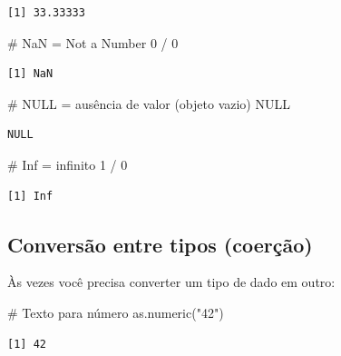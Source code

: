 \documentclass[
  letterpaper,
]{scrbook}
\newenvironment{Shaded}{\begin{snugshade}}{\end{snugshade}}
\newcommand{\CommentTok}[1]{\textcolor[rgb]{0.37,0.37,0.37}{#1}}
\newcommand{\ConstantTok}[1]{\textcolor[rgb]{0.56,0.35,0.01}{#1}}
\newcommand{\DecValTok}[1]{\textcolor[rgb]{0.68,0.00,0.00}{#1}}
\newcommand{\FunctionTok}[1]{\textcolor[rgb]{0.28,0.35,0.67}{#1}}
\newcommand{\NormalTok}[1]{\textcolor[rgb]{0.00,0.23,0.31}{#1}}
\newcommand{\SpecialCharTok}[1]{\textcolor[rgb]{0.37,0.37,0.37}{#1}}
\newcommand{\StringTok}[1]{\textcolor[rgb]{0.13,0.47,0.30}{#1}}
\begin{document}
\begin{verbatim}
[1] 33.33333
\end{verbatim}

\begin{Shaded}
\begin{Highlighting}[]
\CommentTok{\# NaN = Not a Number}
\DecValTok{0} \SpecialCharTok{/} \DecValTok{0}
\end{Highlighting}
\end{Shaded}

\begin{verbatim}
[1] NaN
\end{verbatim}

\begin{Shaded}
\begin{Highlighting}[]
\CommentTok{\# NULL = ausência de valor (objeto vazio)}
\ConstantTok{NULL}
\end{Highlighting}
\end{Shaded}

\begin{verbatim}
NULL
\end{verbatim}

\begin{Shaded}
\begin{Highlighting}[]
\CommentTok{\# Inf = infinito}
\DecValTok{1} \SpecialCharTok{/} \DecValTok{0}
\end{Highlighting}
\end{Shaded}

\begin{verbatim}
[1] Inf
\end{verbatim}

\subsection{Conversão entre tipos
(coerção)}\label{conversuxe3o-entre-tipos-coeruxe7uxe3o}

Às vezes você precisa converter um tipo de dado em outro:

\begin{Shaded}
\begin{Highlighting}[]
\CommentTok{\# Texto para número}
\FunctionTok{as.numeric}\NormalTok{(}\StringTok{"42"}\NormalTok{)}
\end{Highlighting}
\end{Shaded}

\begin{verbatim}
[1] 42
\end{verbatim}
\end{document}
